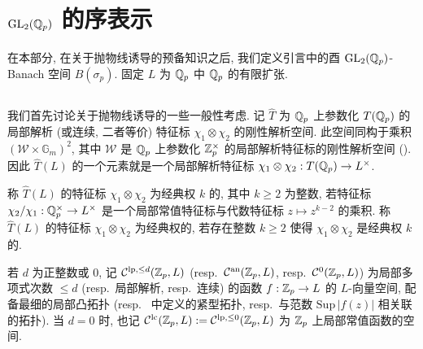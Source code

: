 
\section{$\mathrm{GL}_2(\mathbb{Q}_p)$ 的序表示}

在本部分, 在关于抛物线诱导的预备知识之后, 我们定义引言中的酉 $\mathrm{GL}_2(\mathbb{Q}_p)$-Banach 空间 $B(\sigma_p)$.
固定 $L$ 为 $\mathbb{Q}_p$ 中 $\mathbb{Q}_p$ 的有限扩张.

\subsection{\mbox{}}\label{sec:2.1}

我们首先讨论关于抛物线诱导的一些一般性考虑.
记 $\widehat{T}$ 为 $\mathbb{Q}_p$ 上参数化 $T(\mathbb{Q}_p)$ 的局部解析 (或连续, 二者等价) 特征标 $\chi_1 \otimes \chi_2$ 的刚性解析空间.
此空间同构于乘积 $(\mathcal{W} \times \mathbb{G}_m)^{2}$, 其中 $\mathcal{W}$ 是 $\mathbb{Q}_p$ 上参数化 $\mathbb{Z}_p^{\times}$ 的局部解析特征标的刚性解析空间 (\cite[\S4.4]{ref:24}).
因此 $\widehat{T}(L)$ 的一个元素就是一个局部解析特征标 $\chi_1 \otimes \chi_2 : T(\mathbb{Q}_p) \to L^{\times}$.

\begin{definition}\label{def:2.1.1}
称 $\widehat{T}(L)$ 的特征标 $\chi_1 \otimes \chi_2$ 为经典权 $k$ 的, 其中 $k \ge 2$ 为整数, 若特征标 $\chi_2/\chi_1 : \mathbb{Q}_p^{\times} \to L^{\times}$ 是一个局部常值特征标与代数特征标 $z \mapsto z^{k-2}$ 的乘积.
称 $\widehat{T}(L)$ 的特征标 $\chi_1 \otimes \chi_2$ 为经典权的, 若存在整数 $k \ge 2$ 使得 $\chi_1 \otimes \chi_2$ 是经典权 $k$ 的.
\end{definition}

若 $d$ 为正整数或 $0$, 记 $\mathcal{C}^{\mathrm{lp},\le d}(\mathbb{Z}_p,L)$ (resp.\ $\mathcal{C}^{\mathrm{an}}(\mathbb{Z}_p,L)$, resp.\ $\mathcal{C}^{0}(\mathbb{Z}_p,L)$) 为局部多项式次数 $\le d$ (resp.\ 局部解析, resp.\ 连续) 的函数 $f : \mathbb{Z}_p \to L$ 的 $L$-向量空间, 配备最细的局部凸拓扑 (resp.\ \cite{ref:44} 中定义的紧型拓扑, resp.\ 与范数 $\mathrm{Sup}\,|f(z)|$ 相关联的拓扑).
当 $d = 0$ 时, 也记 $\mathcal{C}^{\mathrm{lc}}(\mathbb{Z}_p,L) := \mathcal{C}^{\mathrm{lp},\le 0}(\mathbb{Z}_p,L)$ 为 $\mathbb{Z}_p$ 上局部常值函数的空间.

